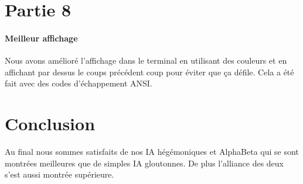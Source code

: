 \documentclass[a4paper]{article}
\begin{document}
    \section{Partie 8}
    \paragraph{Meilleur affichage} Nous avons amélioré l'affichage dans le
    terminal en utilisant des couleurs et en affichant par dessus le coups
    précédent coup pour éviter que ça défile. Cela a été fait avec des codes
    d'échappement ANSI.

    \section{Conclusion}
    Au final nous sommes satisfaits de nos IA hégémoniques et AlphaBeta qui se 
    sont montrées meilleures que de simples IA gloutonnes. De plus l'alliance 
    des deux s'est aussi montrée supérieure.
\end{document}
